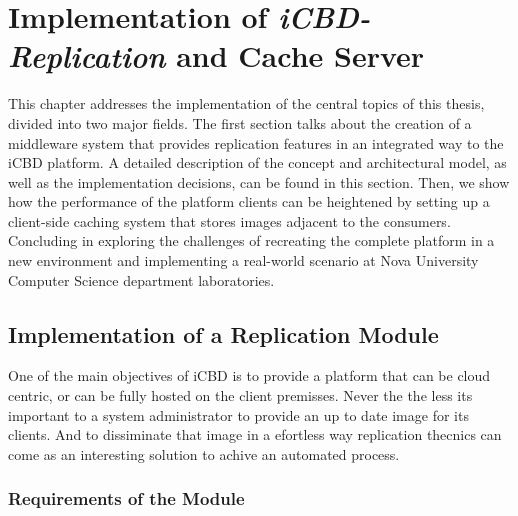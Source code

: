 \chapter{Implementation of \textit{iCBD-Replication} and Cache Server}
\label{cha:replication}

This chapter addresses the implementation of the central topics of this thesis, divided into two major fields.
The first section talks about the creation of a middleware system that provides replication features in an integrated way to the iCBD platform. A detailed description of the concept and architectural model, as well as the implementation decisions, can be found in this section.
Then, we show how the performance of the platform clients can be heightened by setting up a client-side caching system that stores images adjacent to the consumers. Concluding in exploring the challenges of recreating the complete platform in a new environment and implementing a real-world scenario at Nova University Computer Science department laboratories.


\section{Implementation of a Replication Module}
\label{sec:replication_impl}

One of the main objectives of iCBD is to provide a platform that can be cloud centric, or can be fully hosted on the client premisses. Never the the less its important to a system administrator to provide an up to date image for its clients. And to dissiminate that image in a efortless way replication thecnics can come as an interesting solution to achive an automated process.

\subsection{Requirements of the Module}
\label{sub:requirements_icbdrep}


